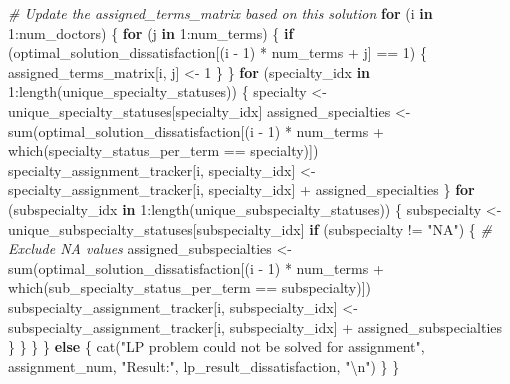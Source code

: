 \documentclass[
]{article}
\newenvironment{Shaded}{\begin{snugshade}}{\end{snugshade}}
\newcommand{\CommentTok}[1]{\textcolor[rgb]{0.56,0.35,0.01}{\textit{#1}}}
\newcommand{\ControlFlowTok}[1]{\textcolor[rgb]{0.13,0.29,0.53}{\textbf{#1}}}
\newcommand{\DecValTok}[1]{\textcolor[rgb]{0.00,0.00,0.81}{#1}}
\newcommand{\FunctionTok}[1]{\textcolor[rgb]{0.00,0.00,0.00}{#1}}
\newcommand{\NormalTok}[1]{#1}
\newcommand{\OtherTok}[1]{\textcolor[rgb]{0.56,0.35,0.01}{#1}}
\newcommand{\SpecialCharTok}[1]{\textcolor[rgb]{0.00,0.00,0.00}{#1}}
\newcommand{\StringTok}[1]{\textcolor[rgb]{0.31,0.60,0.02}{#1}}
\begin{document}
\begin{Shaded}
\begin{Highlighting}[]
    \CommentTok{\# Update the assigned\_terms\_matrix based on this solution}
    \ControlFlowTok{for}\NormalTok{ (i }\ControlFlowTok{in} \DecValTok{1}\SpecialCharTok{:}\NormalTok{num\_doctors) \{}
        \ControlFlowTok{for}\NormalTok{ (j }\ControlFlowTok{in} \DecValTok{1}\SpecialCharTok{:}\NormalTok{num\_terms) \{}
            \ControlFlowTok{if}\NormalTok{ (optimal\_solution\_dissatisfaction[(i }\SpecialCharTok{{-}} \DecValTok{1}\NormalTok{) }\SpecialCharTok{*}\NormalTok{ num\_terms }\SpecialCharTok{+}\NormalTok{ j] }\SpecialCharTok{==} \DecValTok{1}\NormalTok{) \{}
\NormalTok{                assigned\_terms\_matrix[i, j] }\OtherTok{\textless{}{-}} \DecValTok{1}
\NormalTok{            \}}
\NormalTok{        \}}
        \ControlFlowTok{for}\NormalTok{ (specialty\_idx }\ControlFlowTok{in} \DecValTok{1}\SpecialCharTok{:}\FunctionTok{length}\NormalTok{(unique\_specialty\_statuses)) \{}
\NormalTok{            specialty }\OtherTok{\textless{}{-}}\NormalTok{ unique\_specialty\_statuses[specialty\_idx]}
\NormalTok{            assigned\_specialties }\OtherTok{\textless{}{-}} \FunctionTok{sum}\NormalTok{(optimal\_solution\_dissatisfaction[(i }\SpecialCharTok{{-}} \DecValTok{1}\NormalTok{) }\SpecialCharTok{*}\NormalTok{ num\_terms }\SpecialCharTok{+} \FunctionTok{which}\NormalTok{(specialty\_status\_per\_term }\SpecialCharTok{==}\NormalTok{ specialty)])}
\NormalTok{            specialty\_assignment\_tracker[i, specialty\_idx] }\OtherTok{\textless{}{-}}\NormalTok{ specialty\_assignment\_tracker[i, specialty\_idx] }\SpecialCharTok{+}\NormalTok{ assigned\_specialties}
\NormalTok{        \}}
        \ControlFlowTok{for}\NormalTok{ (subspecialty\_idx }\ControlFlowTok{in} \DecValTok{1}\SpecialCharTok{:}\FunctionTok{length}\NormalTok{(unique\_subspecialty\_statuses)) \{}
\NormalTok{            subspecialty }\OtherTok{\textless{}{-}}\NormalTok{ unique\_subspecialty\_statuses[subspecialty\_idx]}
            \ControlFlowTok{if}\NormalTok{ (subspecialty }\SpecialCharTok{!=} \StringTok{"NA"}\NormalTok{) \{  }\CommentTok{\# Exclude NA values}
\NormalTok{                assigned\_subspecialties }\OtherTok{\textless{}{-}} \FunctionTok{sum}\NormalTok{(optimal\_solution\_dissatisfaction[(i }\SpecialCharTok{{-}} \DecValTok{1}\NormalTok{) }\SpecialCharTok{*}\NormalTok{ num\_terms }\SpecialCharTok{+} \FunctionTok{which}\NormalTok{(sub\_specialty\_status\_per\_term }\SpecialCharTok{==}\NormalTok{ subspecialty)])}
\NormalTok{                subspecialty\_assignment\_tracker[i, subspecialty\_idx] }\OtherTok{\textless{}{-}}\NormalTok{ subspecialty\_assignment\_tracker[i, subspecialty\_idx] }\SpecialCharTok{+}\NormalTok{ assigned\_subspecialties}
\NormalTok{            \}}
\NormalTok{        \}}
\NormalTok{    \}}
\NormalTok{\} }\ControlFlowTok{else}\NormalTok{ \{}
    \FunctionTok{cat}\NormalTok{(}\StringTok{"LP problem could not be solved for assignment"}\NormalTok{, assignment\_num, }\StringTok{"Result:"}\NormalTok{, lp\_result\_dissatisfaction, }\StringTok{"}\SpecialCharTok{\textbackslash{}n}\StringTok{"}\NormalTok{)}
\NormalTok{  \}}
\NormalTok{\}}


\end{Highlighting}
\end{Shaded}
\end{document}
